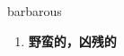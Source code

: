 
\begin{frame}
{\huge barbarous}
\begin{center}
\begin{enumerate}\Large
  \item \textbf{野蛮的，凶残的}
\end{enumerate}
\end{center}
\end{frame}
